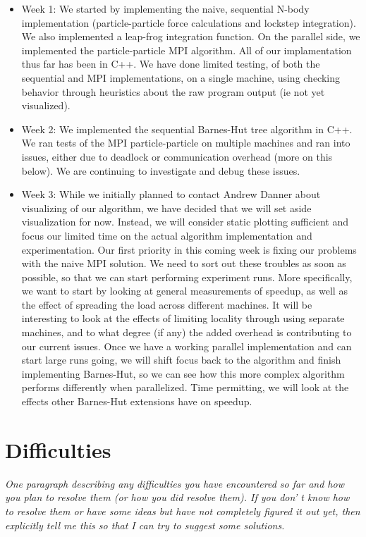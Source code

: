 \documentclass[11pt]{article}
\begin{document}
\begin{itemize}
\item Week 1: We started by implementing the naive, sequential N-body implementation (particle-particle force calculations and lockstep integration). We also implemented a leap-frog integration function. 
On the parallel side, we implemented the particle-particle MPI algorithm. All of our implamentation thus far has been in C++. We have done limited testing, of both the sequential and MPI implementations, on a single  machine, using checking behavior through heuristics about the raw program output (ie not yet visualized).
\item Week 2: We implemented the sequential Barnes-Hut tree algorithm in C++. We ran tests of the MPI particle-particle on multiple machines and ran into issues, either due to deadlock or communication overhead (more on this below). We are continuing to investigate and debug these issues.

\item Week 3: While we initially planned to contact Andrew Danner about visualizing of our algorithm, we have decided that we will set aside visualization for now. Instead, we will consider static plotting sufficient and focus our limited time on the actual algorithm implementation and experimentation. Our first priority in this coming week is fixing our problems with the naive MPI solution. We need to sort out these troubles as soon as possible, so that we can start performing experiment runs. More specifically, we want to start by looking at general measurements of speedup, as well as the effect of spreading the load across different machines. It will be interesting to look at the effects of limiting locality through using separate machines, and to what degree (if any) the added overhead is contributing to our current issues. Once we have a working parallel implementation and can start large runs going, we will shift focus back to the algorithm and finish implementing Barnes-Hut, so we can see how this more complex algorithm performs differently when parallelized. Time permitting, we will look at the effects other Barnes-Hut extensions have on speedup.
\end{itemize}

\section {Difficulties}
{\it
One paragraph describing any difficulties you have encountered so far and how
you plan to resolve them (or how you did resolve them). If you don' t know how
to resolve them or have some ideas but have not completely figured it out yet,
then explicitly tell me this so that I can try to suggest some solutions.}
\end{document}
